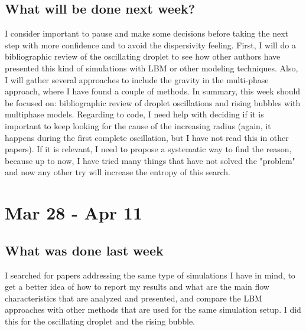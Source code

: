 \documentclass[12pt]{article}
\begin{document}
	\subsection*{What will be done next week?}
	I consider important to pause and make some decisions before taking the next step with more confidence and to avoid the dispersivity feeling. First, I will do a bibliographic review of the oscillating droplet to see how other authors have presented this kind of simulations with LBM or other modeling techniques. Also, I will gather several approaches to include the gravity in the multi-phase approach, where I have found a couple of methods. In summary, this week should be focused on: bibliographic review of droplet oscillations and rising bubbles with multiphase models. Regarding to code, I need help with deciding if it is important to keep looking for the cause of the increasing radius (again, it happens during the first complete oscillation, but I have not read this in other papers). If it is relevant, I need to propose a systematic way to find the reason, because up to now, I have tried many things that have not solved the "problem" and now any other try will increase the entropy of this search.
	
	\pagebreak
	\section*{Mar 28 - Apr 11}
	\subsection*{What was done last week}
	I searched for papers addressing the same type of simulations I have in mind, to get a better idea of how to report my results and what are the main flow characteristics that are analyzed and presented, and compare the LBM approaches with other methods that are used for the same simulation setup. I did this for the oscillating droplet and the rising bubble. 
	
\end{document}
